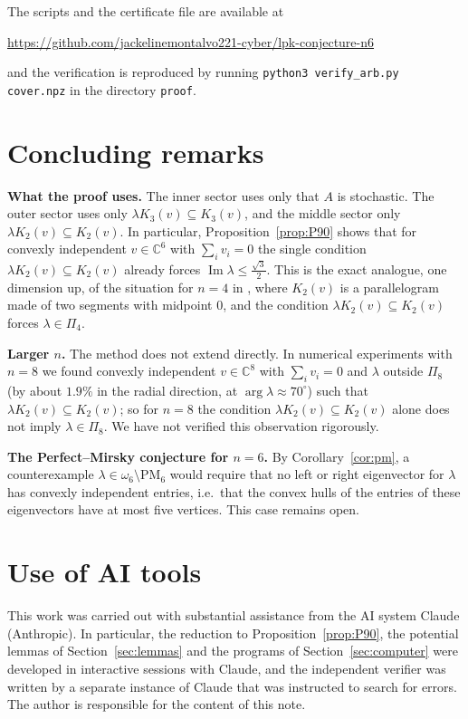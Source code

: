 \documentclass[11pt]{amsart}
\newcommand{\repourl}{https://github.com/jackelinemontalvo221-cyber/lpk-conjecture-n6}
\theoremstyle{definition}
\theoremstyle{remark}
\newcommand{\C}{\mathbb{C}}
\renewcommand{\Im}{\operatorname{Im}}
\newcommand{\PM}{\mathrm{PM}}
\newcommand{\sq}{\tfrac{\sqrt3}{2}}
\begin{document}
The scripts and the certificate file are available at
\begin{center}\url{\repourl}\end{center}
and the verification is reproduced by running \texttt{python3 verify\_arb.py cover.npz} in the directory \texttt{proof}.

\section{Concluding remarks}\label{sec:remarks}

\textbf{What the proof uses.} The inner sector uses only that $A$ is stochastic. The outer sector uses only $\lambda K_3(v)\subseteq K_3(v)$, and the middle sector only $\lambda K_2(v)\subseteq K_2(v)$. In particular, Proposition~\ref{prop:P90} shows that for convexly independent $v\in\C^6$ with $\sum_iv_i=0$ the single condition $\lambda K_2(v)\subseteq K_2(v)$ already forces $\Im\lambda\le\sq$. This is the exact analogue, one dimension up, of the situation for $n=4$ in \cite{LPK15}, where $K_2(v)$ is a parallelogram made of two segments with midpoint $0$, and the condition $\lambda K_2(v)\subseteq K_2(v)$ forces $\lambda\in\Pi_4$.

\textbf{Larger $n$.} The method does not extend directly. In numerical experiments with $n=8$ we found convexly independent $v\in\C^8$ with $\sum_iv_i=0$ and $\lambda$ outside $\Pi_8$ (by about $1.9\%$ in the radial direction, at $\arg\lambda\approx70^\circ$) such that $\lambda K_2(v)\subseteq K_2(v)$; so for $n=8$ the condition $\lambda K_2(v)\subseteq K_2(v)$ alone does not imply $\lambda\in\Pi_8$. We have not verified this observation rigorously.

\textbf{The Perfect--Mirsky conjecture for $n=6$.} By Corollary~\ref{cor:pm}, a counterexample $\lambda\in\omega_6\setminus\PM_6$ would require that no left or right eigenvector for $\lambda$ has convexly independent entries, i.e.\ that the convex hulls of the entries of these eigenvectors have at most five vertices. This case remains open.

\section*{Use of AI tools}
This work was carried out with substantial assistance from the AI system Claude (Anthropic). In particular, the reduction to Proposition~\ref{prop:P90}, the potential lemmas of Section~\ref{sec:lemmas} and the programs of Section~\ref{sec:computer} were developed in interactive sessions with Claude, and the independent verifier was written by a separate instance of Claude that was instructed to search for errors. The author is responsible for the content of this note.
\end{document}
